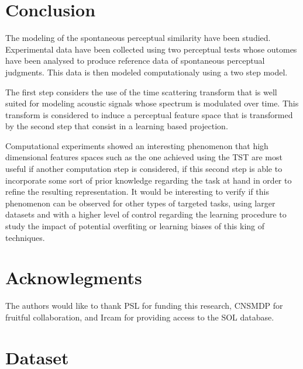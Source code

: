 \documentclass{article}
\begin{document}
\section{Conclusion}

The modeling of the spontaneous perceptual similarity have been studied. Experimental data have been collected using two perceptual tests whose outomes have been analysed to produce reference data of spontaneous perceptual judgments. This data is then modeled computationaly using a two step model.

The first step considers the use of the time scattering transform that is well suited for modeling acoustic signals whose spectrum is modulated over time. This transform is considered to induce a perceptual feature space that is transformed by the second step that consist in a learning based projection.

Computational experiments showed an interesting phenomenon that high dimensional features spaces such as the one achieved using the TST are most useful if another computation step is considered, if this second step is able to incorporate some sort of prior knowledge regarding the task at hand in order to refine the resulting representation. It would be interesting to verify if this phenomenon can be observed for other types of targeted tasks, using larger datasets and with a higher level of control regarding the learning procedure to study the impact of potential overfiting or learning biases of this king of techniques.


\section*{Acknowlegments}

The authors would like to thank
PSL for funding this research,
CNSMDP for fruitful collaboration,
and Ircam for providing access to the SOL database.






\section{Dataset} \label{sec:dataset}
\end{document}
